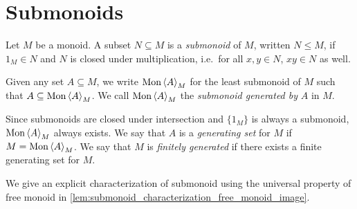 \section{Submonoids}

\begin{definition}
  \label{def:submonoid}
  \rocqok{}
Let $M$ be a monoid. A subset $N\subseteq M$ is a \emph{submonoid} of $M$, written $N\leq M$, if
$1_M \in N$ and $N$ is closed under multiplication, i.e.\ for all $x, y \in N$, $xy \in N$ as
well.
\end{definition}

\begin{definition}%
  \label{def:generated_submonoid}
  \rocqok{}
Given any set $A\subseteq M$, we write $\textrm{Mon}\left\langle A \right\rangle_M$ for the least submonoid of $M$
such that $A\subseteq \textrm{Mon}\left\langle A \right\rangle_M$. We call $\textrm{Mon}\left\langle A \right\rangle_M$ the
\emph{submonoid generated by} $A$ in $M$.
\end{definition}
Since submonoids are closed under intersection and
$\{1_M\}$ is always a submonoid, $\textrm{Mon}\left\langle A \right\rangle_M$ always exists. We say that $A$ is a
\emph{generating set} for $M$ if $M = \textrm{Mon}\left\langle A \right\rangle_M$. We say that $M$ is
\emph{finitely generated} if there exists a finite generating set for $M$.

We give an explicit characterization of submonoid using the universal property of free monoid in
\cref{lem:submonoid_characterization_free_monoid_image}.

